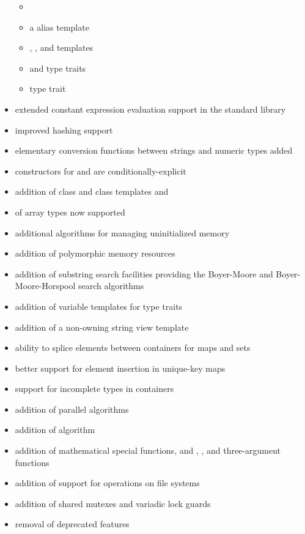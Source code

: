 \begin{itemize}
\begin{itemize}
  \item {}
  \item a  alias template
  \item {}, , and  templates
  \item {} and  type traits
  \item {} type trait
\end{itemize}
\item extended constant expression evaluation support in the standard library
\item improved hashing support
\item elementary conversion functions between strings and numeric types added
\item constructors for  and  are conditionally-explicit
\item addition of class  and class templates  and 
\item {} of array types now supported
\item additional algorithms for managing uninitialized memory
\item addition of polymorphic memory resources
\item addition of substring search facilities providing the Boyer-Moore and Boyer-Moore-Horspool search algorithms
\item addition of variable templates for type traits
\item addition of a non-owning string view template
\item ability to splice elements between containers for maps and sets
\item better support for element insertion in unique-key maps
\item support for incomplete types in containers
\item addition of parallel algorithms
\item addition of  algorithm
\item addition of mathematical special functions, and , , and three-argument  functions
\item addition of support for operations on file systems
\item addition of shared mutexes and variadic lock guards
\item removal of deprecated features
\end{itemize}
